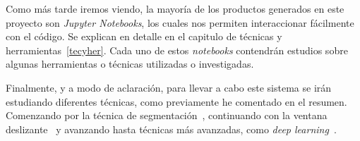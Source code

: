 Como más tarde iremos viendo, la mayoría de los productos generados en este proyecto son \textit{Jupyter Notebooks}, los cuales nos permiten interaccionar fácilmente con el código. Se explican en detalle en el capitulo de técnicas y herramientas~\ref{tecyher}. Cada uno de estos \textit{notebooks} contendrán estudios sobre algunas herramientas o técnicas utilizadas o investigadas.

Finalmente, y a modo de aclaración, para llevar a cabo este sistema se irán estudiando diferentes técnicas, como previamente he comentado en el resumen. Comenzando por la técnica de segmentación~\cite{wiki:segmentation}, continuando con la ventana deslizante~\cite{slidingwindow} y avanzando hasta técnicas más avanzadas, como \textit{deep learning}~\cite{deeplearning}.
